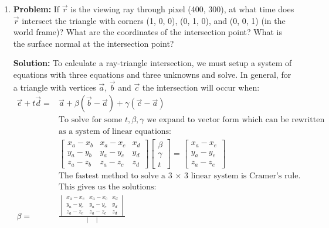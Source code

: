 \documentclass[a4paper, 12pt]{article}
\begin{document}
\begin{enumerate}
    \item \textbf{Problem:} If $\vec{r}$ is the viewing ray through pixel (400, 300), at what time does $\vec{r}$ intersect the triangle with corners (1, 0, 0), (0, 1, 0), and (0, 0, 1) (in the world frame)? What are the coordinates of the intersection point? What is the surface normal at the intersection point?

        \textbf{Solution:} To calculate a ray-triangle intersection, we must setup a system of equations with three equations and three unknowns and solve. In general, for a triangle with vertices $\vec{a}$, $\vec{b}$ and $\vec{c}$ the intersection will occur when:
    \begin{align*}
        \vec{e} + t\vec{d} =& \vec{a} + \beta(\vec{b} - \vec{a}) + \gamma(\vec{c} - \vec{a})\\
        &\text{To solve for some $t, \beta, \gamma$ we expand to vector form which can be rewritten}\\
        &\text{as a system of linear equations:}\\
        &\begin{bmatrix}
            x_a-x_b & x_a - x_c & x_d \\
            y_a-y_b & y_a - y_c & y_d \\
            z_a-z_b & z_a - z_c & z_d
        \end{bmatrix}
        \begin{bmatrix}
            \beta \\
            \gamma \\
            t
        \end{bmatrix}
        =
        \begin{bmatrix}
            x_a - x_e \\
            y_a - y_e \\
            z_a - z_e
        \end{bmatrix}\\
        &\text{The fastest method to solve a 3 $\times$ 3 linear system is Cramer's rule.}\\
        &\text{This gives us the solutions:}\\
        \beta =&
        \frac{
        \begin{vmatrix}
            x_a-x_e & x_a - x_c & x_d \\
            y_a-y_e & y_a - y_c & y_d \\
            z_a-z_e & z_a - z_c & z_d
        \end{vmatrix}
        }{
        \begin{vmatrix}

\end{vmatrix}}
\end{align*}
\end{enumerate}
\end{document}
